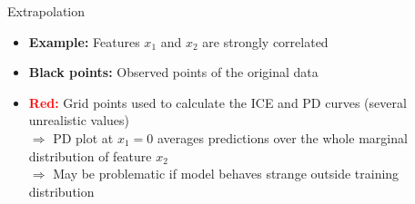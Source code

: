 \documentclass[11pt,compress,t,notes=noshow, aspectratio=169, xcolor=table]{beamer}
\begin{document}
\begin{frame}{Extrapolation}
\begin{itemize}
\item \textbf{Example:} Features $x_1$ and $x_2$ are strongly correlated
\item \textbf{Black points:} Observed points of the original data
\item \textbf{\textcolor{red}{Red:}} Grid points used to calculate the ICE and PD curves (several unrealistic values)\\ %
$\Rightarrow$ %
PD plot at $x_1=0$ averages predictions over the whole marginal distribution of feature $x_2$\\
$\Rightarrow$ May be problematic if model behaves strange outside training distribution
\end{itemize}

%
%
%
%
\end{frame}
\end{document}
